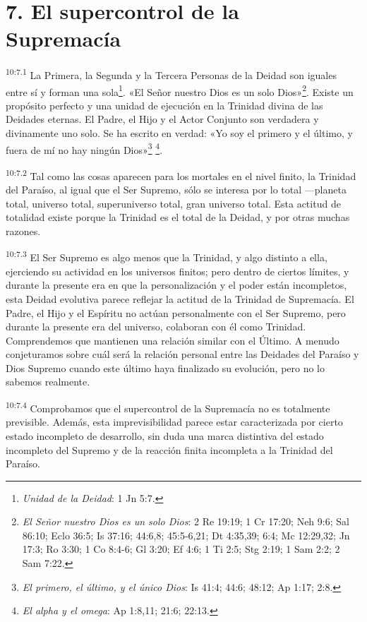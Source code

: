 \section*{7. El supercontrol de la Supremacía}
\par
\textsuperscript{10:7.1} La Primera, la Segunda y la Tercera Personas de la Deidad son iguales entre sí y forman una sola\footnote{\textit{Unidad de la Deidad}: 1 Jn 5:7.}. «El Señor nuestro Dios es un solo Dios»\footnote{\textit{El Señor nuestro Dios es un solo Dios}: 2 Re 19:19; 1 Cr 17:20; Neh 9:6; Sal 86:10; Eclo 36:5; Is 37:16; 44:6,8; 45:5-6,21; Dt 4:35,39; 6:4; Mc 12:29,32; Jn 17:3; Ro 3:30; 1 Co 8:4-6; Gl 3:20; Ef 4:6; 1 Ti 2:5; Stg 2:19; 1 Sam 2:2; 2 Sam 7:22.}. Existe un propósito perfecto y una unidad de ejecución en la Trinidad divina de las Deidades eternas. El Padre, el Hijo y el Actor Conjunto son verdadera y divinamente uno solo. Se ha escrito en verdad: «Yo soy el primero y el último, y fuera de mí no hay ningún Dios»\footnote{\textit{El primero, el último, y el único Dios}: Is 41:4; 44:6; 48:12; Ap 1:17; 2:8.} \footnote{\textit{El alpha y el omega}: Ap 1:8,11; 21:6; 22:13.}.

\par
\textsuperscript{10:7.2} Tal como las cosas aparecen para los mortales en el nivel finito, la Trinidad del Paraíso, al igual que el Ser Supremo, sólo se interesa por lo total ---planeta total, universo total, superuniverso total, gran universo total. Esta actitud de totalidad existe porque la Trinidad es el total de la Deidad, y por otras muchas razones.

\par
\textsuperscript{10:7.3} El Ser Supremo es algo menos que la Trinidad, y algo distinto a ella, ejerciendo su actividad en los universos finitos; pero dentro de ciertos límites, y durante la presente era en que la personalización y el poder están incompletos, esta Deidad evolutiva parece reflejar la actitud de la Trinidad de Supremacía. El Padre, el Hijo y el Espíritu no actúan personalmente con el Ser Supremo, pero durante la presente era del universo, colaboran con él como Trinidad. Comprendemos que mantienen una relación similar con el Último. A menudo conjeturamos sobre cuál será la relación personal entre las Deidades del Paraíso y Dios Supremo cuando este último haya finalizado su evolución, pero no lo sabemos realmente.

\par
\textsuperscript{10:7.4} Comprobamos que el supercontrol de la Supremacía no es totalmente previsible. Además, esta imprevisibilidad parece estar caracterizada por cierto estado incompleto de desarrollo, sin duda una marca distintiva del estado incompleto del Supremo y de la reacción finita incompleta a la Trinidad del Paraíso.

